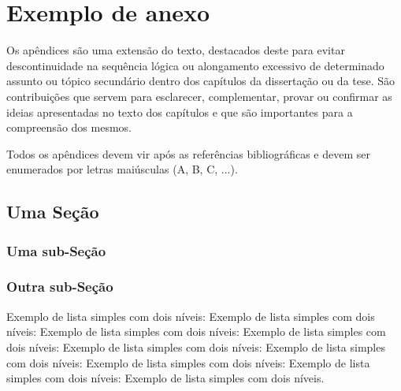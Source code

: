 \chapter{Exemplo de anexo}


Os apêndices são uma extensão do texto, destacados deste para evitar descontinuidade na sequência lógica ou alongamento excessivo de determinado assunto ou tópico secundário dentro dos capítulos da dissertação ou da tese. São contribuições que servem para esclarecer, complementar, provar ou confirmar as ideias apresentadas no texto dos capítulos e que são importantes para a compreensão dos mesmos.

Todos os apêndices devem vir após as referências bibliográficas e devem ser enumerados por letras maiúsculas (A, B, C, ...).


\section{Uma Seção}

\lipsum[20-23]


\subsection{Uma sub-Seção}

\lipsum[30-33]


\subsection{Outra sub-Seção}

Exemplo de lista simples com dois níveis: Exemplo de lista simples com dois níveis: Exemplo de lista simples com dois níveis: Exemplo de lista simples com dois níveis: Exemplo de lista simples com dois níveis: Exemplo de lista simples com dois níveis: Exemplo de lista simples com dois níveis: Exemplo de lista simples com dois níveis: Exemplo de lista simples com dois níveis.

